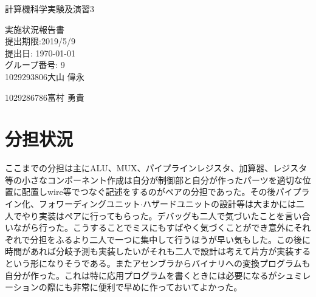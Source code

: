 \documentclass[a4paper,11pt,oneside,openany]{jsarticle}
\begin{document}
\begin{center}

  \vspace*{40mm}
  \huge 計算機科学実験及演習3 \par
  実施状況報告書\\
  \vspace{90mm}
  \Large 提出期限:2019/5/9\\
   提出日: \today \\
  \vspace{15mm}
  \Large グループ番号: 9    \\
   1029293806\hspace{5mm}大山 偉永\par
   1029286786\hspace{5mm}富村 勇貴\par

  \vspace{10mm}
\end{center}
\clearpage
\addtocounter{page}{-1}

\newpage

\section{分担状況}
ここまでの分担は主にALU、MUX、パイプラインレジスタ、加算器、レジスタ等の小さなコンポーネント作成は自分が制御部と自分が作ったパーツを適切な位置に配置しwire等でつなぐ記述をするのがペアの分担であった。その後パイプライン化、フォワーディングユニット$\cdot$ハザードユニットの設計等は大まかには二人でやり実装はペアに行ってもらった。デバッグも二人で気づいたことを言い合いながら行った。こうすることでミスにもすばやく気づくことができ意外にそれぞれで分担をふるより二人で一つに集中して行うほうが早い気もした。この後に時間があれば分岐予測も実装したいがそれも二人で設計は考えて片方が実装するという形になりそうである。またアセンブラからバイナリへの変換プログラムも自分が作った。これは特に応用プログラムを書くときには必要になるがシュミレーションの際にも非常に便利で早めに作っておいてよかった。
\end{document}
